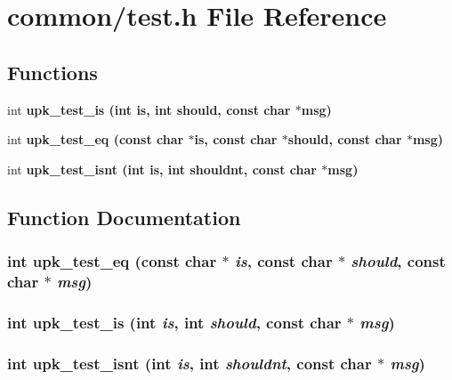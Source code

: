\section{common/test.h File Reference}
\label{test_8h}
\subsection*{Functions}
\begin{CompactItemize}
\item 
int \bf{upk\_\-test\_\-is} (int is, int should, const char $\ast$msg)
\item 
int \bf{upk\_\-test\_\-eq} (const char $\ast$is, const char $\ast$should, const char $\ast$msg)
\item 
int \bf{upk\_\-test\_\-isnt} (int is, int shouldnt, const char $\ast$msg)
\end{CompactItemize}


\subsection{Function Documentation}
\subsubsection{\setlength{\rightskip}{0pt plus 5cm}int upk\_\-test\_\-eq (const char $\ast$ {\em is}, const char $\ast$ {\em should}, const char $\ast$ {\em msg})}\label{test_8h_82c4f602d65902bf8ababa0d674bd7c7}


\subsubsection{\setlength{\rightskip}{0pt plus 5cm}int upk\_\-test\_\-is (int {\em is}, int {\em should}, const char $\ast$ {\em msg})}\label{test_8h_3085148366a02e03d850dacf0e77b48b}


\subsubsection{\setlength{\rightskip}{0pt plus 5cm}int upk\_\-test\_\-isnt (int {\em is}, int {\em shouldnt}, const char $\ast$ {\em msg})}\label{test_8h_2ea5ad40ff205fb2fcf867b2485a40a1}


